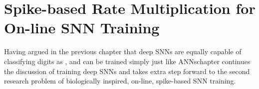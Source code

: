 \chapter{Spike-based Rate Multiplication for On-line SNN Training}
\label{cha:sdlm}
Having argued in the previous chapter that deep SNNs are equally capable of classifying digits as \DIFdelbegin {}\DIFdelend \DIFaddbegin {}\DIFaddend , and can be trained simply just like ANNs\DIFdelbegin {}\DIFdelend \DIFaddbegin {}\DIFaddend chapter continues the discussion of training deep SNNs and takes \DIFaddbegin {}\DIFaddend extra step forward to the second research problem of biologically inspired, on-line, spike-based SNN training.

